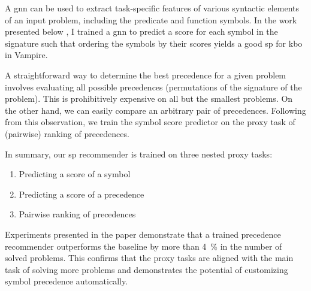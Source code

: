 
\label{sec:results:npr}

A \gls{gnn} can be used to extract task-specific features of various syntactic elements of an input problem,
including the predicate and function symbols.
In the work presented below \cite{DBLP:conf/cade/Bartek021},
I trained a \gls{gnn} to predict a score for each symbol in the signature such that ordering the symbols by their scores yields a good \gls{sp} for \gls{kbo} in Vampire.


A straightforward way to determine the best precedence for a given problem involves evaluating all possible precedences (permutations of the signature of the problem).
This is prohibitively expensive on all but the smallest problems.
On the other hand, we can easily compare an arbitrary pair of precedences.
Following from this observation, we train the symbol score predictor on the proxy task of (pairwise) ranking of precedences.

In summary, our \gls{sp} recommender is trained on three nested proxy tasks:
\begin{enumerate}
\item Predicting a score of a symbol
\item Predicting a score of a precedence
\item Pairwise ranking of precedences
\end{enumerate}

Experiments presented in the paper demonstrate that a trained precedence recommender outperforms the baseline by more than \SI{4}{\percent} in the number of solved problems.
This confirms that the proxy tasks are aligned with the main task of solving more problems and demonstrates the potential of customizing symbol precedence automatically.



